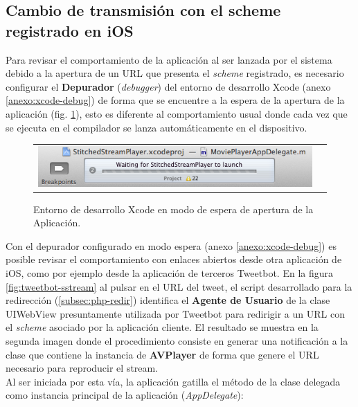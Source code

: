   \subsection{Cambio de transmisión con el scheme registrado en iOS}
  
  Para revisar el comportamiento de la aplicación al ser lanzada por el sistema debido a la apertura de un URL que presenta el \textit{scheme} registrado, es necesario configurar el \textbf{Depurador} (\textit{debugger}) del entorno de desarrollo Xcode (anexo \ref{anexo:xcode-debug}) de forma que se encuentre a la espera de la apertura de la aplicación (fig. \ref{fig:xcode-waitforapp}), esto es diferente al comportamiento usual donde cada vez que se ejecuta en el compilador se lanza automáticamente en el dispositivo.\\

  \begin{figure}[H]
	\centering
	\begin{tabular}{cc}
	\includegraphics[scale=0.7]{imgs/xcode-waitforapp.png}
	\end{tabular}
	\caption{Entorno de desarrollo Xcode en modo de espera de apertura de la Aplicación.}
	\label{fig:xcode-waitforapp}
\end{figure}

\enlargethispage{\baselineskip}
Con el depurador configurado en modo espera (anexo \ref{anexo:xcode-debug}) es posible revisar el comportamiento con enlaces abiertos desde otra aplicación de iOS, como por ejemplo desde la aplicación de terceros Tweetbot. En la figura \ref{fig:tweetbot-sstream} al pulsar en el URL del tweet, el script desarrollado para la redirección (\ref{subsec:php-redir}) identifica el \textbf{Agente de Usuario} de la clase UIWebView presuntamente utilizada por Tweetbot para redirigir a un URL con el \textit{scheme} asociado por la aplicación cliente. El resultado se muestra en la segunda imagen donde el procedimiento consiste en generar una notificación a la clase que contiene la instancia de \textbf{AVPlayer} de forma que genere el URL necesario para reproducir el stream.\\

Al ser iniciada por esta vía, la aplicación gatilla el método de la clase delegada como instancia principal de la aplicación (\textit{AppDelegate}):\\

